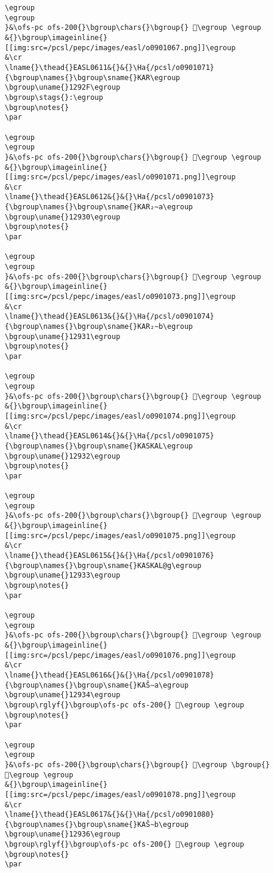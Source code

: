 \begin{verbatim}
\egroup
\egroup
}&\ofs-pc ofs-200{}\bgroup\chars{}\bgroup{} 𒤮\egroup \egroup
&{}\bgroup\imageinline{}[[img:src=/pcsl/pepc/images/easl/o0901067.png]]\egroup
&\cr
\lname{}\thead{}EASL0611&{}&{}\Ha{/pcsl/o0901071}{\bgroup\names{}\bgroup\sname{}KAR\egroup
\bgroup\uname{}1292F\egroup
\bgroup\stags{}:\egroup
\bgroup\notes{}
\par 

\egroup
\egroup
}&\ofs-pc ofs-200{}\bgroup\chars{}\bgroup{} 𒤯\egroup \egroup
&{}\bgroup\imageinline{}[[img:src=/pcsl/pepc/images/easl/o0901071.png]]\egroup
&\cr
\lname{}\thead{}EASL0612&{}&{}\Ha{/pcsl/o0901073}{\bgroup\names{}\bgroup\sname{}KAR₂∼a\egroup
\bgroup\uname{}12930\egroup
\bgroup\notes{}
\par 

\egroup
\egroup
}&\ofs-pc ofs-200{}\bgroup\chars{}\bgroup{} 𒤰\egroup \egroup
&{}\bgroup\imageinline{}[[img:src=/pcsl/pepc/images/easl/o0901073.png]]\egroup
&\cr
\lname{}\thead{}EASL0613&{}&{}\Ha{/pcsl/o0901074}{\bgroup\names{}\bgroup\sname{}KAR₂∼b\egroup
\bgroup\uname{}12931\egroup
\bgroup\notes{}
\par 

\egroup
\egroup
}&\ofs-pc ofs-200{}\bgroup\chars{}\bgroup{} 𒤱\egroup \egroup
&{}\bgroup\imageinline{}[[img:src=/pcsl/pepc/images/easl/o0901074.png]]\egroup
&\cr
\lname{}\thead{}EASL0614&{}&{}\Ha{/pcsl/o0901075}{\bgroup\names{}\bgroup\sname{}KASKAL\egroup
\bgroup\uname{}12932\egroup
\bgroup\notes{}
\par 

\egroup
\egroup
}&\ofs-pc ofs-200{}\bgroup\chars{}\bgroup{} 𒤲\egroup \egroup
&{}\bgroup\imageinline{}[[img:src=/pcsl/pepc/images/easl/o0901075.png]]\egroup
&\cr
\lname{}\thead{}EASL0615&{}&{}\Ha{/pcsl/o0901076}{\bgroup\names{}\bgroup\sname{}KASKAL@g\egroup
\bgroup\uname{}12933\egroup
\bgroup\notes{}
\par 

\egroup
\egroup
}&\ofs-pc ofs-200{}\bgroup\chars{}\bgroup{} 𒤳\egroup \egroup
&{}\bgroup\imageinline{}[[img:src=/pcsl/pepc/images/easl/o0901076.png]]\egroup
&\cr
\lname{}\thead{}EASL0616&{}&{}\Ha{/pcsl/o0901078}{\bgroup\names{}\bgroup\sname{}KAŠ∼a\egroup
\bgroup\uname{}12934\egroup
\bgroup\rglyf{}\bgroup\ofs-pc ofs-200{} 𒤴\egroup \egroup
\bgroup\notes{}
\par 

\egroup
\egroup
}&\ofs-pc ofs-200{}\bgroup\chars{}\bgroup{} 𒤵\egroup \bgroup{} 𒤴\egroup \egroup
&{}\bgroup\imageinline{}[[img:src=/pcsl/pepc/images/easl/o0901078.png]]\egroup
&\cr
\lname{}\thead{}EASL0617&{}&{}\Ha{/pcsl/o0901080}{\bgroup\names{}\bgroup\sname{}KAŠ∼b\egroup
\bgroup\uname{}12936\egroup
\bgroup\rglyf{}\bgroup\ofs-pc ofs-200{} 𒤶\egroup \egroup
\bgroup\notes{}
\par 


\end{verbatim}

